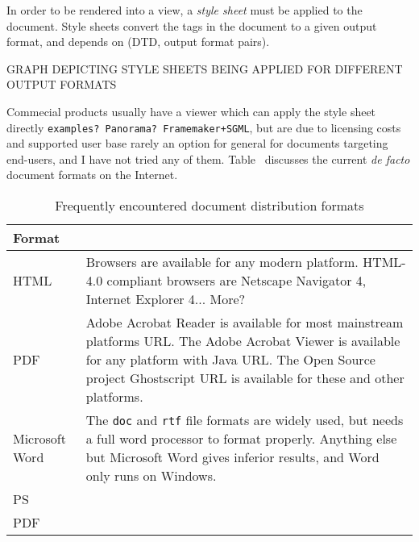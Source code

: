 In order to be rendered into a view, a \textit{style sheet} must be
applied to the document.  Style sheets convert the tags in the
document to a given output format, and depends on (DTD, output format
pairs).


\textsf{GRAPH DEPICTING STYLE SHEETS BEING APPLIED FOR DIFFERENT
  OUTPUT FORMATS}





Commecial products usually have a viewer which can apply the style
sheet directly \texttt{examples? Panorama? Framemaker+SGML}, but are
due to licensing costs and supported user base rarely an option for
general for documents targeting end-users, and I have not tried any of
them.  Table~ discusses the current
\textit{de facto} document formats on the Internet.


\begin{table}[htbp]
  \begin{center}
    \begin{tabular}{|l|p{10cm}|}
      \hline\hline
      Format & \\
      \hline

      HTML & Browsers are available for any modern platform.  HTML-4.0
      compliant browsers are Netscape Navigator 4, Internet Explorer
      4... \textsf{More?} \\ 
      
      PDF & Adobe Acrobat Reader is available for most
      mainstream platforms \textsf{URL}.  The Adobe Acrobat Viewer is
      available for any platform with Java \textsf{URL}.  The Open
      Source project Ghostscript \textsf{URL} is available for these
      and other platforms. \\
  
      
      Microsoft Word & The \texttt{doc} and \texttt{rtf} file formats
      are widely used, but needs a full word processor to format
      properly.  Anything else but Microsoft Word gives inferior
      results, and Word only runs on Windows.
      \\
      PS & \\
      PDF &\\

      \hline
    \end{tabular}
    \caption{Frequently encountered document distribution formats}
    \label{tab:distribution-formats}
  \end{center}
\end{table}



